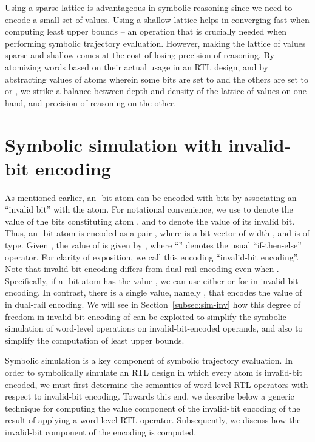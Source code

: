 \documentclass{llncs}
\begin{document}
Using a sparse lattice is advantageous in symbolic reasoning since we
need to encode a small set of values.  Using a shallow lattice helps
in converging fast when computing least upper bounds -- an operation
that is crucially needed when performing symbolic trajectory
evaluation.  However, making the lattice of values sparse and shallow
comes at the cost of losing precision of reasoning.  By atomizing
words based on their actual usage in an RTL design, and by abstracting
values of atoms wherein some bits are set to  and the others are
set to  or , we strike a balance between depth and density of
the lattice of values on one hand, and precision of reasoning on the
other.

\section{Symbolic simulation with invalid-bit encoding}\label{sec:encoding}
As mentioned earlier, an -bit atom can be encoded with  bits
by associating an ``invalid bit'' with the atom.  For notational
convenience, we use  to denote the value of the  bits
constituting atom , and  to denote the value of its
invalid bit.  Thus, an -bit atom  is encoded as a pair
, where  is a bit-vector of width
, and  is of  type.  Given
, the value of  is given by
, where ``'' denotes
the usual ``if-then-else'' operator.  For clarity of exposition, we
call this encoding ``invalid-bit encoding''.  Note that invalid-bit
encoding differs from dual-rail encoding even when .
Specifically, if a -bit atom  has the value , we can use
either  or  for  in
invalid-bit encoding.  In contrast, there is a single value, namely
, that encodes the value  of  in dual-rail
encoding.  We will see in Section~\ref{subsec:sim-inv} how this degree
of freedom in invalid-bit encoding of  can be exploited to simplify
the symbolic simulation of word-level operations on
invalid-bit-encoded operands, and also to simplify the computation of
least upper bounds.

Symbolic simulation is a key component of symbolic trajectory
evaluation.  In order to symbolically simulate an RTL design in which
every atom is invalid-bit encoded, we must first determine the
semantics of word-level RTL operators with respect to invalid-bit
encoding.  Towards this end, we describe below a generic technique for
computing the value component of the invalid-bit encoding of the
result of applying a word-level RTL operator.  Subsequently, we
discuss how the invalid-bit component of the encoding is computed.
\end{document}
